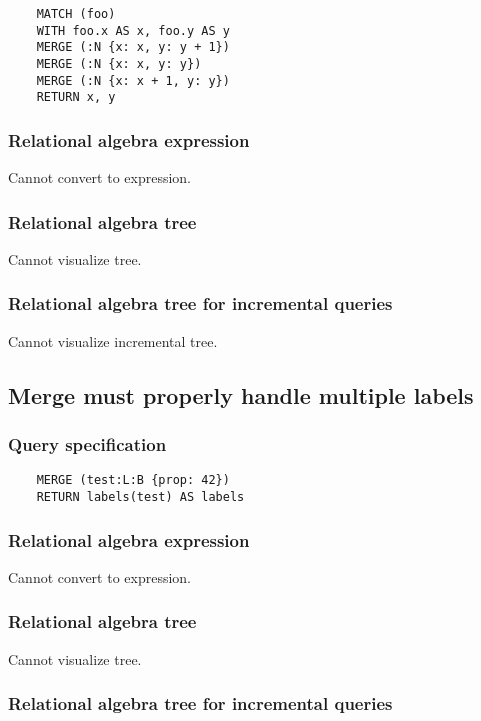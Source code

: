 	\begin{lstlisting}
	MATCH (foo)
	WITH foo.x AS x, foo.y AS y
	MERGE (:N {x: x, y: y + 1})
	MERGE (:N {x: x, y: y})
	MERGE (:N {x: x + 1, y: y})
	RETURN x, y
	\end{lstlisting}


	\subsubsection*{Relational algebra expression}

	Cannot convert to expression.

	\subsubsection*{Relational algebra tree}

	Cannot visualize tree.

	\subsubsection*{Relational algebra tree for incremental queries}

	Cannot visualize incremental tree.
	\subsection{Merge must properly handle multiple labels}

	\subsubsection*{Query specification}

	\begin{lstlisting}
	MERGE (test:L:B {prop: 42})
	RETURN labels(test) AS labels
	\end{lstlisting}


	\subsubsection*{Relational algebra expression}

	Cannot convert to expression.

	\subsubsection*{Relational algebra tree}

	Cannot visualize tree.

	\subsubsection*{Relational algebra tree for incremental queries}

